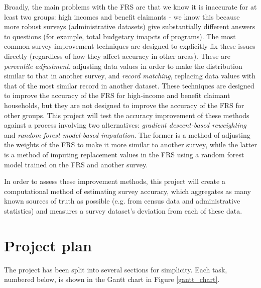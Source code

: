 \documentclass[twocolumn]{article}
\begin{document}
Broadly, the main problems with the FRS are that we know it is inaccurate for at least two groups: high incomes and benefit claimants - we know this because more robust surveys (administrative datasets) give substantially different answers to questions (for example, total budgetary imapcts of programs). The most common survey improvement techniques are designed to explicitly fix these issues directly (regardless of how they affect accuracy in other areas). These are \emph{percentile adjustment}, adjusting data values in order to make the distribution similar to that in another survey, and \emph{record matching}, replacing data values with that of the most similar record in another dataset. These techniques are designed to improve the accuracy of the FRS for high-income and benefit claimant households, but they are not designed to improve the accuracy of the FRS for other groups. This project will test the accuracy improvement of these methods against a process involving two alternatives: \emph{gradient descent-based reweighting} and \emph{random forest model-based imputation}. The former is a method of adjusting the weights of the FRS to make it more similar to another survey, while the latter is a method of imputing replacement values in the FRS using a random forest model trained on the FRS and another survey.

In order to assess these improvement methods, this project will create a computational method of estimating survey accuracy, which aggregates as many known sources of truth as possible (e.g. from census data and administrative statistics) and measures a survey dataset's deviation from each of these data.
\newpage
\section{Project plan}

The project has been split into several sections for simplicity. Each task, numbered below, is shown in the Gantt chart in Figure \ref{gantt_chart}.
\end{document}
